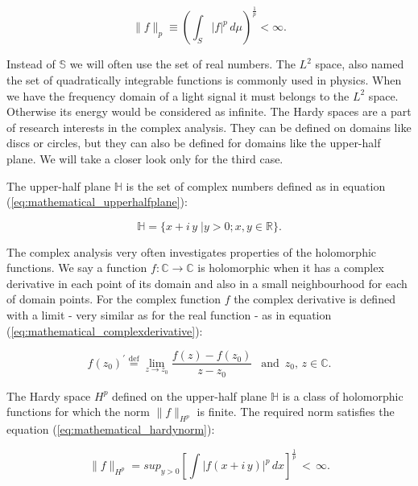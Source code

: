 \documentclass[12pt,twoside,a4paper]{article}
\numberwithin{equation}{subsection}
\numberwithin{figure}{subsection}
\begin{document}
\begin{equation} \label{eg:mathematical_lebesgue}
  \|f\|_p \equiv ( \int_{S} |f|^p \, d\mu) ^ {\frac{1}{p}} < \infty .
\end{equation}

Instead of $\mathbb{S}$ we will often use the set of real numbers. The $L^2$ space, also named the set of quadratically integrable functions
is commonly used in physics. When we have the frequency domain of a light signal it must belongs to the $L^2$ space. Otherwise its energy would
be considered as infinite. The Hardy spaces are a part of research interests in the complex analysis. They can be defined on domains like
discs or circles, but they can also be defined for domains like the upper-half plane. We will take a closer look only for the third case.

The upper-half plane $ \mathbb{H} $ is the set of complex numbers defined as in equation (\ref{eq:mathematical_upperhalfplane}):

\begin{equation} \label{eq:mathematical_upperhalfplane}
  \mathbb{H} = \{ x + i \, y \;| y > 0; x, y \in \mathbb{R} \} .
\end{equation}

The complex analysis very often investigates properties of the holomorphic functions. We say a function $f : \mathbb{C} \to \mathbb{C}$ is
holomorphic when it has a complex derivative in each point of its domain and also in a small neighbourhood for each of domain points. For
the complex function $f$ the complex derivative is defined with a limit - very similar as for the real function - as in equation
(\ref{eq:mathematical_complexderivative}):

\begin{equation} \label{eq:mathematical_complexderivative}
  f(z_0)^{'} \stackrel{\mathrm{def}}{=} \lim_{z \to z_0} \frac{f(z) - f(z_0)}{z - z_0} \; \, \text{ and } \, z_0, \, z \in \mathbb{C} .
\end{equation}

The Hardy space $ H^{p} $ defined on the upper-half plane $ \mathbb{H} $ is a class of holomorphic functions for which the norm $
\|f\|_{H^p} $ is finite. The required norm satisfies the equation (\ref{eq:mathematical_hardynorm}):

\begin{equation} \label{eq:mathematical_hardynorm}
  \|f\|_{H^p} = sup_{ y > 0 } \left[ \int |f(x + i \, y)|^{p} \, dx \right]^{\frac{1}{p}} \, < \, \infty.
\end{equation}
\end{document}
